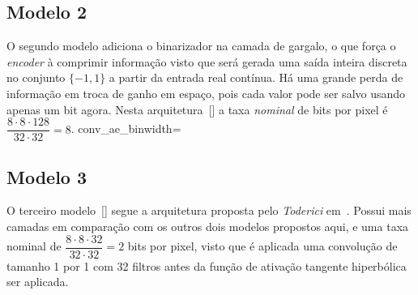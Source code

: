 \subsection{Modelo 2}
\label{cap3:mod2}
O segundo modelo adiciona o binarizador na camada de gargalo, o que força o \textit{encoder} à comprimir informação visto que será gerada uma saída inteira discreta no conjunto $\{-1, 1\}$ a partir da entrada real contínua. Há uma grande perda de informação em troca de ganho em espaço, pois cada valor pode ser salvo usando apenas um bit agora. Nesta arquitetura~[] a taxa \emph{nominal} de bits por pixel é $\dfrac{8\cdot8\cdot128}{32\cdot32} = 8$. 
 {conv_ae_bin}{width=\textwidth}
\subsection{Modelo 3}
\label{cap3:mod3}
O terceiro modelo~[] segue a arquitetura proposta pelo \textit{Toderici} em~\cite{toderici2015variable}. Possui mais camadas em comparação com os outros dois modelos propostos aqui, e uma taxa nominal de $\dfrac{8\cdot8\cdot32}{32\cdot32} = 2$ bits por pixel, visto que é aplicada uma convolução de tamanho 1 por 1 com 32 filtros antes da função de ativação tangente hiperbólica ser aplicada.
